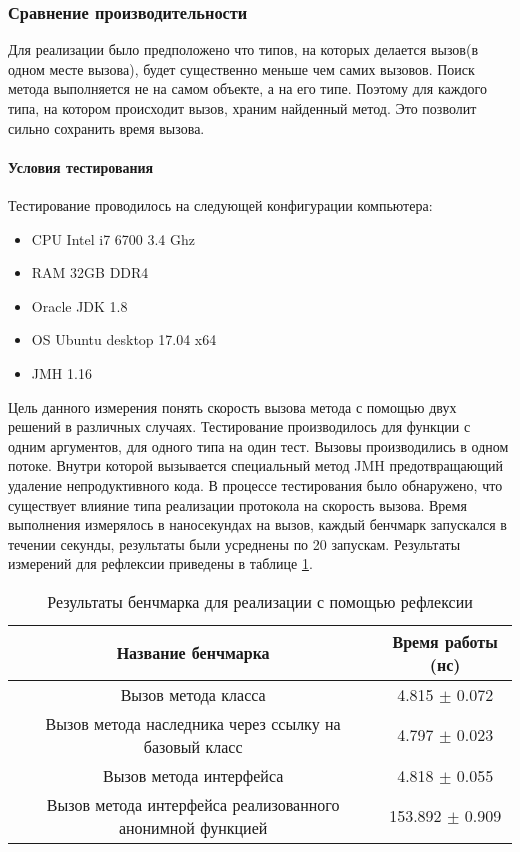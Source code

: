 \subsubsection{Сравнение производительности}
Для реализации было предположено что типов, на которых делается вызов(в одном месте вызова), будет существенно меньше чем самих вызовов. Поиск метода выполняется не на самом объекте, а на его типе. Поэтому для каждого типа, на котором происходит вызов, храним найденный метод. Это позволит сильно сохранить время вызова.

\paragraph{Условия тестирования}
Тестирование проводилось на следующей конфигурации компьютера:
\begin{itemize}
    \item CPU Intel i7 6700 3.4 Ghz
    \item RAM 32GB DDR4
    \item Oracle JDK 1.8
    \item OS Ubuntu desktop 17.04 x64
    \item JMH 1.16
\end{itemize}

Цель данного измерения понять скорость вызова метода с помощью двух решений в различных случаях. Тестирование производилось для функции с одним аргументов, для одного типа на один тест. Вызовы производились в одном потоке. Внутри которой вызывается специальный метод JMH предотвращающий удаление непродуктивного кода. В процессе тестирования было обнаружено, что существует влияние типа реализации протокола на скорость вызова. Время выполнения измерялось в наносекундах на вызов, каждый бенчмарк запускался в течении секунды, результаты были усреднены по 20 запускам. Результаты измерений для рефлексии приведены в таблице \ref{benchmark:prototype:reflection}.
\begin{table}[h]
\begin{center}
\begin{tabular}{|c|c|} \hline
Название бенчмарка & Время работы (нс) \\ \hline
Вызов метода класса & 4.815 $\pm$ 0.072 \\ \hline
Вызов метода наследника через ссылку на базовый класс & 4.797 $\pm$ 0.023 \\ \hline
Вызов метода интерфейса & 4.818 $\pm$ 0.055 \\ \hline
Вызов метода интерфейса реализованного анонимной функцией & 153.892 $\pm$ 0.909 \\ \hline
\end{tabular}
\caption{Результаты бенчмарка для реализации с помощью рефлексии}
\label{benchmark:prototype:reflection}
\end{center}
\end{table}

